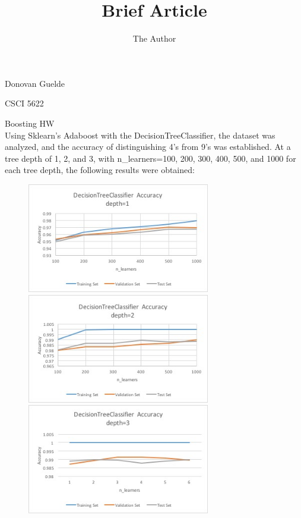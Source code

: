 \documentclass[11pt, oneside]{article}   	%
\title{Brief Article}
\author{The Author}
\begin{document}
\hfill Donovan Guelde

\hfill CSCI 5622

\hfill Boosting HW\\

Using Sklearn's Adaboost with the DecisionTreeClassifier, the dataset was analyzed, and the accuracy of distinguishing 4's from 9's was established.  At a tree depth of 1, 2, and 3, with n\_learners=100, 200, 300, 400, 500, and 1000 for each tree depth, the following results were obtained:\\
\begin{figure}
\includegraphics[width=8cm]{decisionTree1} 
\includegraphics[width=8cm]{decisionTree2} 
\includegraphics[width=8cm]{decisionTree3}
\end{figure}\\
\end{document}
